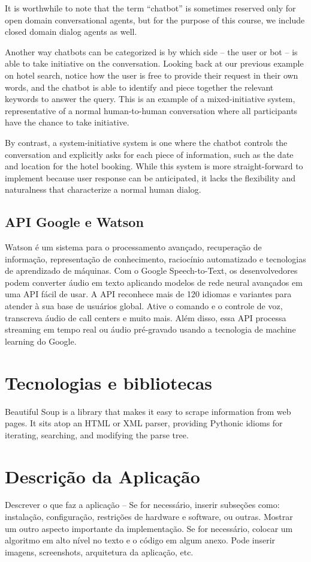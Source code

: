 \documentclass[
	12pt,				%
	oneside,   	        %
	a4paper,			%
	english,			%
	french,				%
	spanish,			%
	brazil,				%
	]{pacotes/abntex2}
\begin{document}
It is worthwhile to note that the term “chatbot” is sometimes reserved only for open domain conversational agents, but for the purpose of this course, we include closed domain dialog agents as well.

Another way chatbots can be categorized is by which side – the user or bot – is able to take initiative on the conversation. Looking back at our previous example on hotel search, notice how the user is free to provide their request in their own words, and the chatbot is able to identify and piece together the relevant keywords to answer the query. This is an example of a mixed-initiative system, representative of a normal human-to-human conversation where all participants have the chance to take initiative.

By contrast, a system-initiative system is one where the chatbot controls the conversation and explicitly asks for each piece of information, such as the date and location for the hotel booking. While this system is more straight-forward to implement because user response can be anticipated, it lacks the flexibility and naturalness that characterize a normal human dialog.

\subsection{API Google e Watson}
Watson é um sistema para o processamento avançado, recuperação de informação, representação de conhecimento, raciocínio automatizado e tecnologias de aprendizado de máquinas.
Com o Google Speech-to-Text, os desenvolvedores podem converter áudio em texto aplicando modelos de rede neural avançados em uma API fácil de usar. A API reconhece mais de 120 idiomas e variantes para atender à sua base de usuários global. Ative o comando e o controle de voz, transcreva áudio de call centers e muito mais. Além disso, essa API processa streaming em tempo real ou áudio pré-gravado usando a tecnologia de machine learning do Google. 
\section{Tecnologias e bibliotecas}
Beautiful Soup is a library that makes it easy to scrape information from web pages. It sits atop an HTML or XML parser, providing Pythonic idioms for iterating, searching, and modifying the parse tree.

\section{Descrição da Aplicação}
Descrever o que faz a aplicação – Se for necessário, inserir subseções como: instalação,
configuração, restrições de hardware e software, ou outras.
Mostrar um outro aspecto importante da implementação. Se for necessário, colocar
um algoritmo em alto nível no texto e o código em algum anexo.
Pode inserir imagens, screenshots, arquitetura da aplicação, etc.
\end{document}
